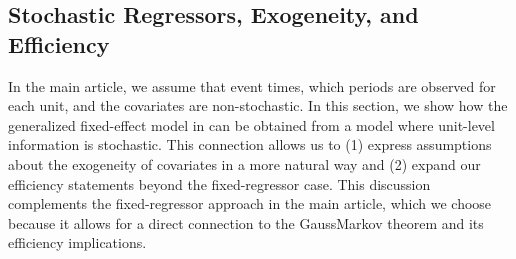 \documentclass[english,11pt]{article}
\theoremstyle{plain}
\theoremstyle{plain}
\theoremstyle{plain}
\theoremstyle{plain}
\let\ref\Cref
\begin{document}
\subsection{Stochastic Regressors, Exogeneity, and Efficiency\label{subsec:Stochastic-Regressors}}

In the main article, we assume that event times, which periods are
observed for each unit, and the covariates are non-stochastic. In
this section, we show how the generalized fixed-effect model in \ref{sec:Setting}
can be obtained from a model where unit-level information is stochastic.
This connection allows us to (1) express assumptions about the exogeneity
of covariates in a more natural way and (2) expand our efficiency
statements beyond the fixed-regressor case. This discussion complements
the fixed-regressor approach in the main article, which we choose
because it allows for a direct connection to the Gauss\textendash Markov
theorem and its efficiency implications.
\end{document}
